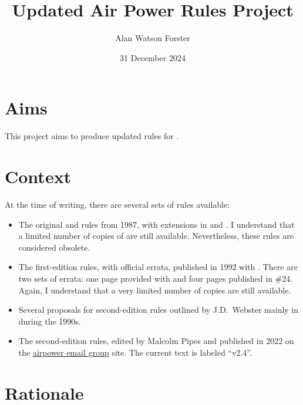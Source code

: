 \documentclass[10pt]{report}
\title{Updated Air Power Rules Project}
\author{Alan Watson Forster}
\date{31 December 2024}
\begin{document}
\twocolumn
\thispagestyle{empty}
\maketitle
\suppressfloats

\section{Aims}

This project aims to produce updated rules for {\AirPow}.

\section{Context}

At the time of writing, there are several sets of rules available:
\begin{itemize}
    \item The original {\AirSup} and {\AirStr} rules from 1987, with extensions in {\DF} and {\EOTG}. I understand that a limited number of copies of {\AirSup} are still available. Nevertheless, these rules are considered obsolete.
    \item The first-edition {\AirPow} rules, with official errata, published in 1992 with {\TSOH}. There are two sets of errata: one page provided with {\TSOH} and four pages published in {\APJ} \#24. Again, I understand that a very limited number of copies are still available.
    \item Several proposals for second-edition rules outlined by J.D.\ Webster mainly in {\APJ} during the 1990s.
    \item The second-edition {\AirPow} rules, edited by Malcolm Pipes and published in 2022 on the \href{https://airpower.groups.io/g/main}{airpower email group} site. The current text is labeled “v2.4”.
\end{itemize}

\section{Rationale}
\end{document}
